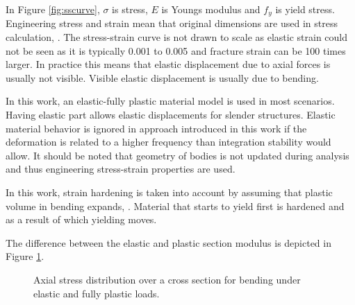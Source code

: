 \documentclass{jcgt}
\begin{document}
In Figure \ref{fig:sscurve}, $\sigma$ is stress, $E$ is Youngs modulus and $f_y$ is yield stress.
Engineering stress and strain mean that original dimensions are used in stress calculation,
\cite{dowling}.
The stress-strain curve is not drawn to scale as elastic strain could not be seen as it is typically 
0.001 to 0.005 and fracture strain can be 100 times larger.
In practice this means that elastic displacement due to axial forces is usually not visible.
Visible elastic displacement is usually due to bending.

In this work, an elastic-fully plastic material model is used in most scenarios.
Having elastic part allows elastic displacements for slender structures. 
Elastic material behavior is ignored in approach introduced in this work if
the deformation is related to a higher frequency
than integration stability would allow.
It should be noted that geometry
of bodies is not updated during analysis and thus engineering stress-strain properties are used.

In this work, strain hardening is taken into account by assuming that plastic volume in bending
expands, 
\cite{dowling}.
Material that starts to yield first is hardened and as a result of which yielding moves.

The difference between the elastic and plastic section modulus is depicted in Figure \ref{fig:wp}.

\begin{figure}[htb!]
\centering
{}
\hspace{1cm}
\caption{Axial stress distribution over a cross section for bending under elastic and fully plastic loads.}
\label{fig:wp}
\end{figure}
\end{document}
